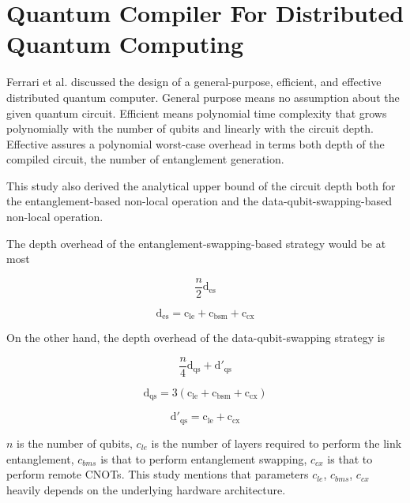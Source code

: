 \section{Quantum Compiler For Distributed Quantum Computing}

Ferrari et al. \cite{distributedquantumcompiler} discussed the design of a general-purpose, efficient, and effective distributed quantum computer. General purpose means no assumption about the given quantum circuit. Efficient means polynomial time complexity that grows polynomially with the number of qubits and linearly with the circuit depth.  Effective assures a polynomial worst-case overhead in terms both depth of the compiled circuit, the number of entanglement generation.

 This study also derived the analytical upper bound of the circuit depth both for the entanglement-based non-local operation and the data-qubit-swapping-based non-local operation.
 
 The depth overhead of the entanglement-swapping-based strategy would be at most 
 
  \begin{equation}
\frac{n}{2} \operatorname{d_{es}}
  \end{equation}
  
 \begin{equation}
  \operatorname{d_{es}} =  \operatorname{c_{le}} +  \operatorname{c_{bsm}} +  \operatorname{c_{cx}}
  \end{equation} 
 
  On the other hand, the depth overhead of the data-qubit-swapping strategy is
  
   \begin{equation} 
  \frac{n}{4} \operatorname{d_{qs}} +  \operatorname{d'_{qs}}
   \end{equation} 
   
   \begin{equation} 
    \operatorname{d_{qs}}= 3( \operatorname{c_{le}} +  \operatorname{c_{bsm}} +  \operatorname{c_{cx}})
    \end{equation}
    
  \begin{equation}
    \operatorname{d'_{qs}} =  \operatorname{c_{le}} + \operatorname{ c_{cx}}
   \end{equation}
  
  $n$ is the number of qubits, $c_{le}$ is the number of layers required to perform the link entanglement, $c_{bms}$ is that to perform entanglement swapping, $c_{cx}$ is that to perform remote CNOTs.
  This study mentions that parameters $c_{le}$, $c_{bms}$, $c_{cx}$ heavily depends on the underlying hardware architecture.
  
